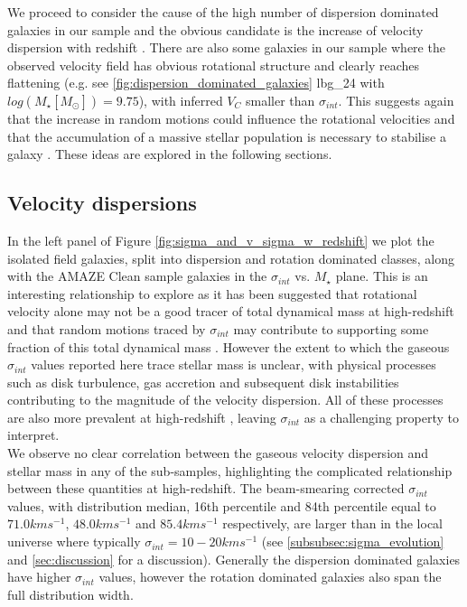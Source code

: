 \documentclass[fleqn,usenatbib]{mn2e}
\begin{document}
We proceed to consider the cause of the high number of dispersion dominated galaxies in our sample and the obvious candidate is the increase of velocity dispersion with redshift \citep[e.g.][]{Genzel2006,Genzel2008,ForsterSchreiber2009,Law2009,Gnerucci2011,Epinat2012,Wisnioski2015}.
There are also some galaxies in our sample where the observed velocity field has obvious rotational structure and clearly reaches flattening (e.g. see \cref{fig:dispersion_dominated_galaxies} lbg\_24 with $log(M_{\star}[M_{\odot}])=9.75$), with inferred $V_{C}$ smaller than $\sigma_{int}$.
This suggests again that the increase in random motions could influence the rotational velocities and that the accumulation of a massive stellar population is necessary to stabilise a galaxy \citep[e.g.][]{Law2009,Law2012b,Law2012c,Newman2013,Wisnioski2015}.
These ideas are explored in the following sections.

\subsection{Velocity dispersions}\label{subsec:results_velocity_dispersions}

In the left panel of Figure \ref{fig:sigma_and_v_sigma_w_redshift} we plot the isolated field galaxies, split into dispersion and rotation dominated classes, along with the AMAZE Clean sample galaxies in the $\sigma_{int}$ vs. $M_{\star}$ plane.
This is an interesting relationship to explore as it has been suggested that rotational velocity alone may not be a good tracer of total dynamical mass at high-redshift and that random motions traced by $\sigma_{int}$ may contribute to supporting some fraction of this total dynamical mass \citep[e.g.][]{Kassin2007,Burkert2010,Kassin2012,Law2012b,Law2012c,Ubler2017,Genzel2017}.
However the extent to which the gaseous $\sigma_{int}$ values reported here trace stellar mass is unclear, with physical processes such as disk turbulence, gas accretion and subsequent disk instabilities contributing to the magnitude of the velocity dispersion.
All of these processes are also more prevalent at high-redshift \citep{Genzel2006,ForsterSchreiber2009,Law2009,Genzel2011,Wisnioski2015,Wuyts2016b}, leaving $\sigma_{int}$ as a challenging property to interpret. \\ 

We observe no clear correlation between the gaseous velocity dispersion and stellar mass in any of the sub-samples, highlighting the complicated relationship between these quantities at high-redshift.
The beam-smearing corrected $\sigma_{int}$ values, with distribution median, 16th percentile and 84th percentile equal to $71.0kms^{-1}$, $48.0kms^{-1}$ and $85.4kms^{-1}$ respectively, are larger than in the local universe where typically $\sigma_{int} = 10-20kms^{-1}$ \citep{Epinat2008a} (see \cref{subsubsec:sigma_evolution} and \cref{sec:discussion} for a discussion).
Generally the dispersion dominated galaxies have higher $\sigma_{int}$ values, however the rotation dominated galaxies also span the full distribution width.
\end{document}
